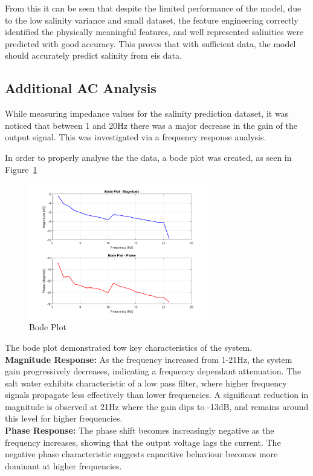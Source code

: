 From this it can be seen that despite the limited performance of the model, due to the low salinity variance and small dataset, the feature engineering correctly identified the physically meaningful features, and well represented salinities were predicted with good accuracy.
This proves that with sufficient data, the model should accurately predict salinity from \gls{eis} data.

\subsection{Additional AC Analysis}
While measuring impedance values for the salinity prediction dataset, it was noticed that between 1 and 20Hz there was a major decrease in the gain of the output signal.
This was investigated via a frequency response analysis.

In order to properly analyse the the data, a bode plot was created, as seen in Figure~\ref{fig:bode}

\begin{figure}[H]
    \centering
    \includegraphics[width=0.7\textwidth]{figures/bode_plot.png}
    \caption{Bode Plot}
    \label{fig:bode}
\end{figure}

The bode plot demonstrated tow key characteristics of the system. \\
\textbf{Magnitude Response:} As the frequency increased from 1-21Hz, the system gain progressively decreases, indicating a frequency dependant attenuation.
The salt water exhibits characteristic of a low pass filter, where higher frequency signals propagate less effectively than lower frequencies.
A significant reduction in magnitude is observed at 21Hz where the gain dips to -13dB, and remains around this level for higher frequencies. \\
\textbf{Phase Response:} The phase shift becomes increasingly negative as the frequency increases, showing that the output voltage lags the current.
The negative phase characteristic suggests capacitive behaviour becomes more dominant at higher frequencies.

